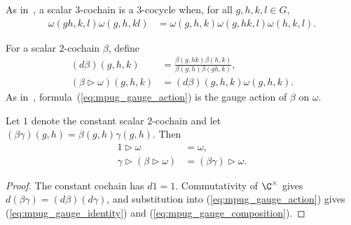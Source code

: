 \begin{definition}
    \label{def:mpug_three_cocycle}
    \leanok
    As in~\cite{FrancoRubio2025MPUGauging}, a scalar $3$-cochain is a
    $3$-cocycle when, for all $g,h,k,l\in G$,
    \begin{align}
        \omega(gh,k,l)\omega(g,h,kl)
         & =\omega(g,h,k)\omega(g,hk,l)\omega(h,k,l).
        \label{eq:mpug_three_cocycle}
    \end{align}
\end{definition}

\begin{definition}
    \label{def:mpug_fusion_gauge}
    \leanok
    For a scalar $2$-cochain $\beta$, define
    \begin{align}
        (d\beta)(g,h,k)
         & =\frac{\beta(g,hk)\beta(h,k)}
            {\beta(g,h)\beta(gh,k)},
        \label{eq:mpug_coboundary}        \\
        (\beta\mathbin{\triangleright}\omega)(g,h,k)
         & =(d\beta)(g,h,k)\omega(g,h,k).
        \label{eq:mpug_gauge_action}
    \end{align}
    As in~\cite{FrancoRubio2025MPUGauging}, formula~(\ref{eq:mpug_gauge_action})
    is the gauge action of $\beta$ on $\omega$.
\end{definition}

\begin{lemma}
    \label{thm:mpug_gauge_action}
    \leanok
    Let $1$ denote the constant scalar $2$-cochain and let
    $(\beta\gamma)(g,h)=\beta(g,h)\gamma(g,h)$. Then
    \begin{align}
        1\mathbin{\triangleright}\omega & =\omega,
        \label{eq:mpug_gauge_identity}                                                  \\
        \gamma\mathbin{\triangleright}
        (\beta\mathbin{\triangleright}\omega)
                                        & =(\beta\gamma)\mathbin{\triangleright}\omega.
        \label{eq:mpug_gauge_composition}
    \end{align}
\end{lemma}
\begin{proof}\leanok
    The constant cochain has $d1=1$. Commutativity of $\C^\times$ gives
    $d(\beta\gamma)=(d\beta)(d\gamma)$, and substitution into
    (\ref{eq:mpug_gauge_action}) gives
    (\ref{eq:mpug_gauge_identity}) and
    (\ref{eq:mpug_gauge_composition}).
\end{proof}

